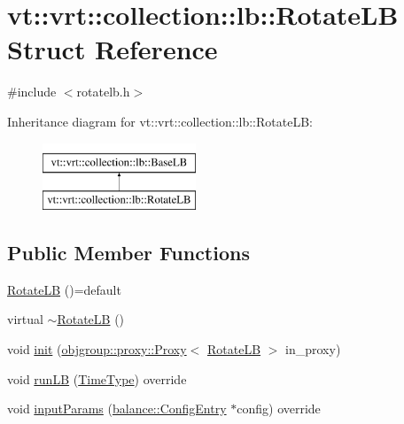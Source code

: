 \hypertarget{structvt_1_1vrt_1_1collection_1_1lb_1_1_rotate_l_b}{}\section{vt\+:\+:vrt\+:\+:collection\+:\+:lb\+:\+:Rotate\+LB Struct Reference}
\label{structvt_1_1vrt_1_1collection_1_1lb_1_1_rotate_l_b}


{\ttfamily \#include $<$rotatelb.\+h$>$}

Inheritance diagram for vt\+:\+:vrt\+:\+:collection\+:\+:lb\+:\+:Rotate\+LB\+:\begin{figure}[H]
\begin{center}
\leavevmode
\includegraphics[height=2.000000cm]{structvt_1_1vrt_1_1collection_1_1lb_1_1_rotate_l_b}
\end{center}
\end{figure}
\subsection*{Public Member Functions}
\begin{DoxyCompactItemize}
\item 
\hyperlink{structvt_1_1vrt_1_1collection_1_1lb_1_1_rotate_l_b_a9cb675c68ec8794d6a2e284ece5de8a8}{Rotate\+LB} ()=default
\item 
virtual \hyperlink{structvt_1_1vrt_1_1collection_1_1lb_1_1_rotate_l_b_ae2a8e40cf47a9ea3be9d4ec6f44d9f50}{$\sim$\+Rotate\+LB} ()
\item 
void \hyperlink{structvt_1_1vrt_1_1collection_1_1lb_1_1_rotate_l_b_a2f0126b5029e1348b86089470ffcd4f2}{init} (\hyperlink{structvt_1_1objgroup_1_1proxy_1_1_proxy}{objgroup\+::proxy\+::\+Proxy}$<$ \hyperlink{structvt_1_1vrt_1_1collection_1_1lb_1_1_rotate_l_b}{Rotate\+LB} $>$ in\+\_\+proxy)
\item 
void \hyperlink{structvt_1_1vrt_1_1collection_1_1lb_1_1_rotate_l_b_af54a83925b1bbe05052c475523110e98}{run\+LB} (\hyperlink{namespacevt_a876a9d0cd5a952859c72de8a46881442}{Time\+Type}) override
\item 
void \hyperlink{structvt_1_1vrt_1_1collection_1_1lb_1_1_rotate_l_b_a39b5c8882b32f8a50be30cf2f3fd8fab}{input\+Params} (\hyperlink{structvt_1_1vrt_1_1collection_1_1balance_1_1_config_entry}{balance\+::\+Config\+Entry} $\ast$config) override
\end{DoxyCompactItemize}
